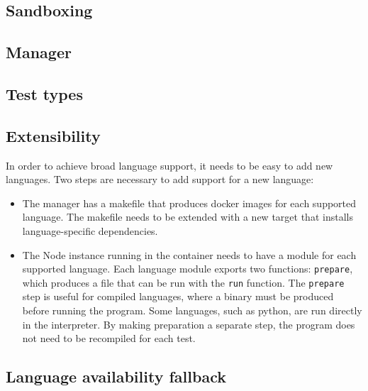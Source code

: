 
\subsection{Sandboxing}
\subsection{Manager}
\subsection{Test types}

\subsection{Extensibility}
In order to achieve broad language support, it needs to be easy to add new languages. Two steps are necessary to add support for a new language:

\begin{itemize}
\item The manager has a makefile that produces docker images for each supported language. The makefile needs to be extended with a new target that installs language-specific dependencies.

\item The Node instance running in the container needs to have a module for each supported language. Each language module exports two functions: \texttt{prepare}, which produces a file that can be run with the \texttt{run} function. The \texttt{prepare} step is useful for compiled languages, where a binary must be produced before running the program. Some languages, such as python, are run directly in the interpreter. By making preparation a separate step, the program does not need to be recompiled for each test.
\end{itemize}

\subsection{Language availability fallback}

